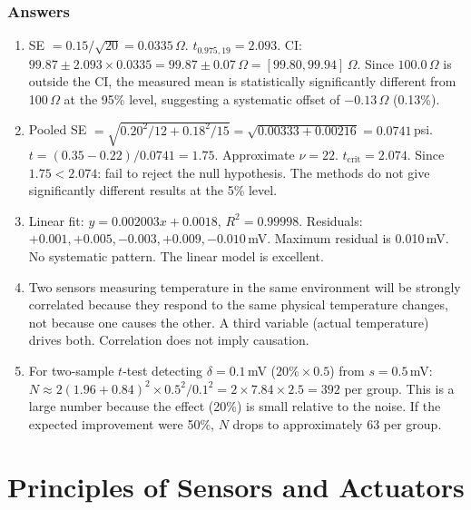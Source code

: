 \documentclass[11pt,letterpaper,twoside,openany]{book}
\begin{document}
\subsection{Answers}
\begin{enumerate}[leftmargin=1.5em]
\item SE $= 0.15/\sqrt{20} = 0.0335\,\Omega$. $t_{0.975,19} = 2.093$. CI: $99.87 \pm 2.093 \times 0.0335 = 99.87 \pm 0.07\,\Omega = [99.80, 99.94]\,\Omega$. Since $100.0\,\Omega$ is outside the CI, the measured mean is statistically significantly different from 100\,$\Omega$ at the 95\% level, suggesting a systematic offset of $-0.13\,\Omega$ (0.13\%).
\item Pooled SE $= \sqrt{0.20^2/12 + 0.18^2/15} = \sqrt{0.00333 + 0.00216} = 0.0741$\,psi. $t = (0.35 - 0.22)/0.0741 = 1.75$. Approximate $\nu = 22$. $t_{\text{crit}} = 2.074$. Since $1.75 < 2.074$: fail to reject the null hypothesis. The methods do not give significantly different results at the 5\% level.
\item Linear fit: $y = 0.002003x + 0.0018$, $R^2 = 0.99998$. Residuals: $+0.001, +0.005, -0.003, +0.009, -0.010$\,mV. Maximum residual is 0.010\,mV. No systematic pattern. The linear model is excellent.
\item Two sensors measuring temperature in the same environment will be strongly correlated because they respond to the same physical temperature changes, not because one causes the other. A third variable (actual temperature) drives both. Correlation does not imply causation.
\item For two-sample $t$-test detecting $\delta = 0.1$\,mV ($20\% \times 0.5$) from $s = 0.5$\,mV: $N \approx 2(1.96 + 0.84)^2 \times 0.5^2 / 0.1^2 = 2 \times 7.84 \times 2.5 = 392$ per group. This is a large number because the effect (20\%) is small relative to the noise. If the expected improvement were 50\%, $N$ drops to approximately 63 per group.
\end{enumerate}
\chapter{Principles of Sensors and Actuators}
\label{ch:sensors}
\end{document}
